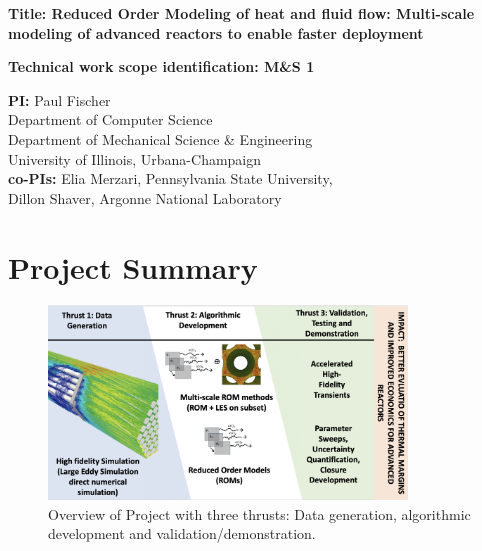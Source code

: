 \parindent 0in
\parskip 0.1in

{\bf Title:  Reduced Order Modeling of heat and fluid flow: Multi-scale
modeling of advanced reactors to enable faster deployment }

{\bf Technical work scope identification: M\&S 1 }

{\bf PI:}
Paul Fischer \\
Department of Computer Science \\
Department of Mechanical Science \& Engineering \\
University of Illinois, Urbana-Champaign \\

{\bf co-PIs:}
Elia Merzari, Pennsylvania State University, \\
Dillon Shaver, Argonne National Laboratory \\

\section{Project Summary}


\begin{figure}[b!] \centering
    \includegraphics[width = 0.85\textwidth]{figs/fig1.png}
    \caption{Overview of Project with three thrusts: Data generation,
             algorithmic development and validation/demonstration.  \label{fig:sum}}
\end{figure}

